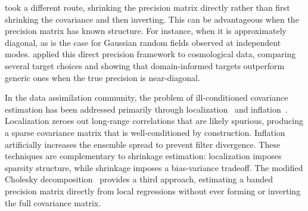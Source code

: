 \citep{bodnar2016direct} took a different route, shrinking the precision matrix directly rather than first shrinking the covariance and then inverting. This can be advantageous when the precision matrix has known structure. For instance, when it is approximately diagonal, as is the case for Gaussian random fields observed at independent modes. \citep{looijmans2024comparison} applied this direct precision framework to cosmological data, comparing several target choices and showing that domain-informed targets outperform generic ones when the true precision is near-diagonal.

In the data assimilation community, the problem of ill-conditioned covariance estimation has been addressed primarily through localization~\citep{gaspari1999construction, ott2004local, hunt2007efficient} and inflation~\citep{anderson1999monte, anderson2001ensemble}. Localization zeroes out long-range correlations that are likely spurious, producing a sparse covariance matrix that is well-conditioned by construction. Inflation artificially increases the ensemble spread to prevent filter divergence. These techniques are complementary to shrinkage estimation: localization imposes sparsity structure, while shrinkage imposes a bias-variance tradeoff. The modified Cholesky decomposition~\citep{nino2018ensemble} provides a third approach, estimating a banded precision matrix directly from local regressions without ever forming or inverting the full covariance matrix.

